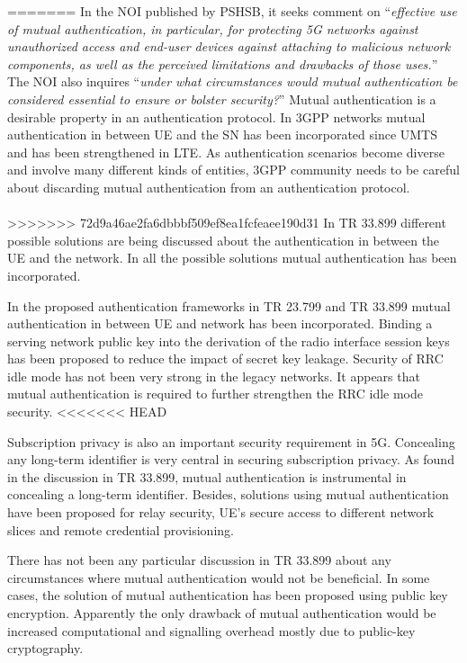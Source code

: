 \documentclass[12pt]{llncs}
\newcommand\ques[1]{``\emph{#1}''}
\begin{document}
=======
In the NOI published by PSHSB, it seeks comment on \ques{effective use of mutual authentication, in particular, for protecting 5G networks against unauthorized access and end-user devices against attaching to malicious network components, as well as the perceived limitations and drawbacks of those uses.} The NOI also inquires \ques{under what circumstances would mutual authentication be considered essential to ensure or
bolster security?} Mutual authentication is a desirable property in an authentication protocol. In 3GPP networks mutual authentication in between UE and the SN has been incorporated since UMTS and has been strengthened in LTE. As authentication scenarios become diverse and involve many different kinds of entities, 3GPP community needs to be careful about discarding mutual authentication from an authentication protocol. 
\paragraph{}
>>>>>>> 72d9a46ae2fa6dbbbf509ef8ea1fcfeaee190d31
In TR 33.899 different possible solutions are being discussed about the authentication in between the UE and the network. In all the possible solutions mutual authentication has been incorporated. 

In the proposed authentication frameworks in TR 23.799 and TR 33.899 mutual authentication in between UE and network has been incorporated. Binding a serving network public key into the derivation of the radio interface session keys has been proposed to reduce the impact of secret key leakage. Security of RRC idle mode has not been very strong in the legacy networks. It appears that mutual authentication is required to further strengthen the RRC idle mode security.
<<<<<<< HEAD

Subscription privacy is also an important security requirement in 5G. Concealing any long-term  identifier is very central in securing subscription privacy. As found in the discussion in TR 33.899, mutual authentication is instrumental in concealing a long-term identifier. Besides, solutions using mutual authentication have been proposed for relay security, UE's secure access to different network slices and remote credential provisioning.

There has not been any particular discussion in TR 33.899 about any circumstances where mutual authentication would not be beneficial. In some cases, the solution of mutual authentication has been proposed using public key encryption. Apparently the only drawback of mutual authentication would be  increased computational and signalling overhead mostly due to public-key cryptography.
\end{document}

